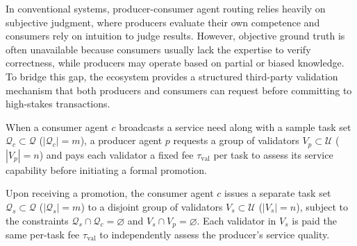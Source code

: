 
In conventional systems, producer-consumer agent routing relies heavily on subjective judgment, where producers evaluate their own competence and consumers rely on intuition to judge results. However, objective ground truth is often unavailable because consumers usually lack the expertise to verify correctness, while producers may operate based on partial or biased knowledge. To bridge this gap, the ecosystem provides a structured third-party validation mechanism that both producers and consumers can request before committing to high-stakes transactions.


\begin{definition}\label{def:promo_validation}
When a consumer agent $c$ broadcasts a service need along with a sample task set $\mathcal{Q}_c \subset \mathcal{Q}$ ($|\mathcal{Q}_c| = m$), a producer agent $p$ requests a group of validators $V_p \subset \mathcal{U}$ ($|V_p| = n$) and pays each validator a fixed fee $\tau_{\text{val}}$ per task to assess its service capability before initiating a formal promotion.
\end{definition}

\begin{definition}\label{def:sub_validation}
Upon receiving a promotion, the consumer agent $c$ issues a separate task set $\mathcal{Q}_s \subset \mathcal{Q}$ ($|\mathcal{Q}_s| = m$) to a disjoint group of validators $V_s \subset \mathcal{U}$ ($|V_s| = n$), subject to the constraints $\mathcal{Q}_s \cap \mathcal{Q}_c = \varnothing$ and $V_s \cap V_p = \varnothing$. Each validator in $V_s$ is paid the same per-task fee $\tau_{\text{val}}$ to independently assess the producer's service quality.
\end{definition}

